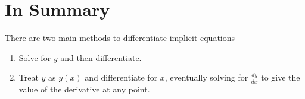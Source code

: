 \documentclass{ximera}
\begin{document}
\section{In Summary}
There are two main methods to differentiate implicit equations
\begin{enumerate}
\item{Solve for $y$ and then differentiate.}
\item{Treat $y$ as $y(x)$ and differentiate for $x$, eventually solving for $\frac{dy}{dx}$ to give the value of the derivative at any point.}
\end{enumerate}
\pagebreak
\end{document}
